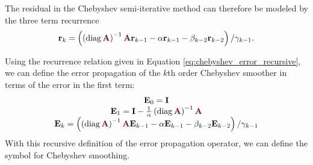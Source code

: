 The residual in the Chebyshev semi-iterative method can therefore be modeled by the three term recurrence
\begin{equation}
\mathbf{r}_k = \left( \left( \diag {\color{burgundy}\mathbf{A}} \right)^{-1} {\color{burgundy}\mathbf{A}} \mathbf{r}_{k - 1} - \alpha \mathbf{r}_{k - 1} - \beta_{k - 2} \mathbf{r}_{k - 2} \right) / \gamma_{k - 1}.
\label{eq:chebyshev_error_recursive}
\end{equation}

Using the recurrence relation given in Equation \ref{eq:chebyshev_error_recursive}, we can define the error propagation of the $k$th order Chebyshev smoother in terms of the error in the first term:
\begin{equation}
\begin{tabular}{c}
$\mathbf{E}_0 = \mathbf{I}$\\
$\mathbf{E}_1 = \mathbf{I} - \frac{1}{\alpha} \left( \diag {\color{burgundy}\mathbf{A}} \right)^{-1} {\color{burgundy}\mathbf{A}}$\\
$\mathbf{E}_k = \left( \left( \diag {\color{burgundy}\mathbf{A}} \right)^{-1} {\color{burgundy}\mathbf{A}} \mathbf{E}_{k - 1} - \alpha \mathbf{E}_{k - 1} - \beta_{k - 2} \mathbf{E}_{k - 2} \right) / \gamma_{k - 1}$
\end{tabular}
\label{eq:chebyshev_error_propagation}
\end{equation}
With this recursive definition of the error propagation operator, we can define the symbol for Chebyshev smoothing.

